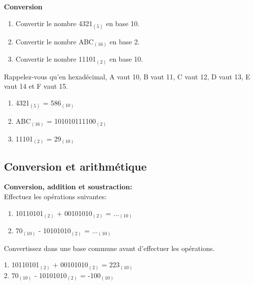 \begin{Exercice}[10 minutes]  \textbf{Conversion }\\
    \begin{enumerate}
        \item Convertir le nombre 4321$_{(5)}$ en base 10.
        \item Convertir le nombre ABC$_{(16)}$ en base 2.
        \item Convertir le nombre 11101$_{(2)}$ en base 10.
    \end{enumerate}
    
        \begin{conseil}
            Rappelez-vous qu'en hexadécimal, A vaut 10, B vaut 11, C vaut 12, D vaut 13, E vaut 14 et F vaut 15.
    \end{conseil}

    \begin{solution}
        \begin{enumerate}
            \item 4321$_{(5)}$ = 586$_{(10)}$
            \item ABC$_{(16)}$ = 101010111100$_{(2)}$
            \item 11101$_{(2)}$ = 29$_{(10)}$
        \end{enumerate}
    \end{solution}
\end{Exercice}

\subsection{Conversion et arithmétique}
\begin{Exercice}[5 minutes] \textbf{Conversion, addition et soustraction:}\\
    Effectuez les opérations suivantes:
    \begin{enumerate}
        \item 10110101$_{(2)}$ + 00101010$_{(2)}$ = ...$_{(10)}$
        \item 70$_{(10)}$ - 10101010$_{(2)}$ = ...$_{(10)}$
    \end{enumerate}
        \begin{conseil}
        Convertissez dans une base commune avant d'effectuer les opérations.
    \end{conseil}
        
    \begin{solution}
        1. 10110101$_{(2)}$ + 00101010$_{(2)}$ = 223$_{(10)}$\\
        2. 70$_{(10)}$ - 10101010$_{(2)}$ = -100$_{(10)}$
    \end{solution}
\end{Exercice}


